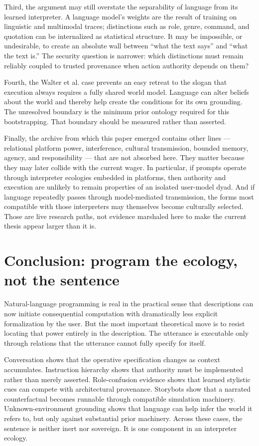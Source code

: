 \documentclass[11pt]{article}
\begin{document}
Third, the argument may still overstate the separability of language from its learned interpreter. A language model's weights are the result of training on linguistic and multimodal traces; distinctions such as role, genre, command, and quotation can be internalized as statistical structure. It may be impossible, or undesirable, to create an absolute wall between ``what the text says'' and ``what the text is.'' The security question is narrower: which distinctions must remain reliably coupled to trusted provenance when action authority depends on them?

Fourth, the Walter et al. case prevents an easy retreat to the slogan that execution always requires a fully shared world model. Language can alter beliefs about the world and thereby help create the conditions for its own grounding. The unresolved boundary is the minimum prior ontology required for this bootstrapping. That boundary should be measured rather than asserted.

Finally, the archive from which this paper emerged contains other lines --- relational platform power, interference, cultural transmission, bounded memory, agency, and responsibility --- that are not absorbed here. They matter because they may later collide with the current wager. In particular, if prompts operate through interpreter ecologies embedded in platforms, then authority and execution are unlikely to remain properties of an isolated user-model dyad. And if language repeatedly passes through model-mediated transmission, the forms most compatible with those interpreters may themselves become culturally selected. Those are live research paths, not evidence marshaled here to make the current thesis appear larger than it is.

\section{Conclusion: program the ecology, not the sentence}

Natural-language programming is real in the practical sense that descriptions can now initiate consequential computation with dramatically less explicit formalization by the user. But the most important theoretical move is to resist locating that power entirely in the description. The utterance is executable only through relations that the utterance cannot fully specify for itself.

Conversation shows that the operative specification changes as context accumulates. Instruction hierarchy shows that authority must be implemented rather than merely asserted. Role-confusion evidence shows that learned stylistic cues can compete with architectural provenance. Storybots show that a narrated counterfactual becomes runnable through compatible simulation machinery. Unknown-environment grounding shows that language can help infer the world it refers to, but only against substantial prior machinery. Across these cases, the sentence is neither inert nor sovereign. It is one component in an interpreter ecology.
\end{document}
